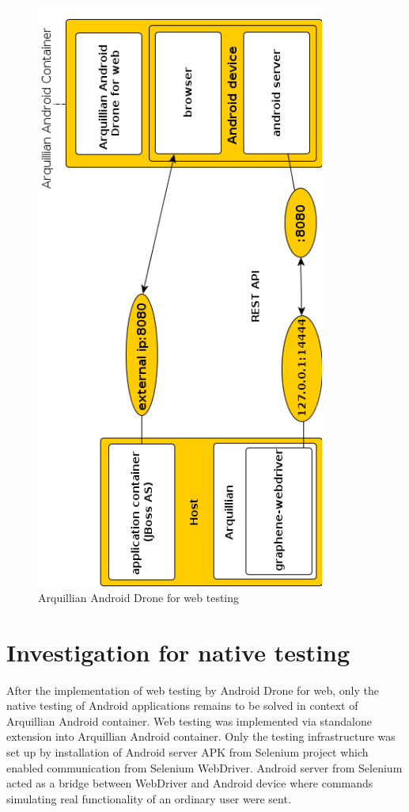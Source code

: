 \documentclass[12pt,final,oneside]{fithesis}
\begin{document}
\begin{figure}[!ht]
	\centering
	\includegraphics[origin=c,width=95mm]{img/webdriver2.png}
	\caption{Arquillian Android Drone for web testing}
	\label{fig:arquillian_drone_web}
\end{figure}

\chapter{Investigation for native testing}

After the implementation of web testing by Android Drone for web, only the native testing of Android applications remains to be solved in context of Arquillian Android container. Web testing was implemented via standalone extension into Arquillian Android container. Only the testing infrastructure was set up by installation of Android server APK from Selenium project which enabled communication from Selenium WebDriver. Android server from Selenium acted as a bridge between WebDriver and Android device where commands simulating real functionality of an ordinary user were sent.
\end{document}

